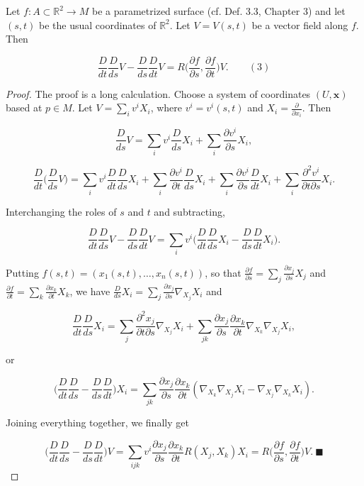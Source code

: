 \begin{lemma}
  \label{lem:dc-ch4-4-1}
  Let $f:A\subset\mathbb{R}^2\to M$ be a parametrized surface (cf. Def. 3.3, Chapter
  3) and let $(s,t)$ be the usual coordinates of $\mathbb{R}^2$. Let $V=V(s,t)$ be a
  vector field along $f$. Then
  
  $$
  \frac{D}{dt}\frac{D}{ds}V-\frac{D}{ds}\frac{D}{dt}V=R\Big(\frac{\partial f}{\partial s},\frac{\partial f}{\partial t}\Big)V.\qquad(3)
  $$
\end{lemma}
\begin{proof}
  The proof is a long calculation. Choose a system of coordinates
  $(U,\mathbf{x})$ based at $p\in M$. Let $V=\sum_i v^i X_i$, where $v^i=v^i(s,t)$ and
  $X_i=\frac{\partial}{\partial x_i}$. Then
  
  $$
  \frac{D}{ds}V=\sum_i v^i\frac{D}{ds}X_i+\sum_i\frac{\partial v^i}{\partial s}X_i,
  $$
  
  $$
  \frac{D}{dt}\Big(\frac{D}{ds}V\Big)=\sum_i v^i\frac{D}{dt}\frac{D}{ds}X_i+\sum_i\frac{\partial v^i}{\partial t}\frac{D}{ds}X_i+\sum_i\frac{\partial v^i}{\partial s}\frac{D}{dt}X_i+\sum_i\frac{\partial^2 v^i}{\partial t\partial s}X_i.
  $$
  
  Interchanging the roles of $s$ and $t$ and subtracting,
  
  $$
  \frac{D}{dt}\frac{D}{ds}V-\frac{D}{ds}\frac{D}{dt}V=\sum_i v^i\Big(\frac{D}{dt}\frac{D}{ds}X_i-\frac{D}{ds}\frac{D}{dt}X_i\Big).
  $$
  
  Putting $f(s,t)=(x_1(s,t),\dots,x_n(s,t))$, so that
  $\frac{\partial f}{\partial s}=\sum_j\frac{\partial x_j}{\partial s}X_j$ and
  $\frac{\partial f}{\partial t}=\sum_k\frac{\partial x_k}{\partial t}X_k$, we have
  $\frac{D}{ds}X_i=\sum_j\frac{\partial x_j}{\partial s}\nabla_{X_j}X_i$ and
  
  $$
  \frac{D}{dt}\frac{D}{ds}X_i=\sum_j\frac{\partial^2 x_j}{\partial t\partial s}\nabla_{X_j}X_i+\sum_{jk}\frac{\partial x_j}{\partial s}\frac{\partial x_k}{\partial t}\nabla_{X_k}\nabla_{X_j}X_i,
  $$
  
  or
  
  $$
  \Big(\frac{D}{dt}\frac{D}{ds}-\frac{D}{ds}\frac{D}{dt}\Big)X_i=\sum_{jk}\frac{\partial x_j}{\partial s}\frac{\partial x_k}{\partial t}(\nabla_{X_k}\nabla_{X_j}X_i-\nabla_{X_j}\nabla_{X_k}X_i).
  $$
  
  Joining everything together, we finally get
  
  $$
  \Big(\frac{D}{dt}\frac{D}{ds}-\frac{D}{ds}\frac{D}{dt}\Big)V=\sum_{ijk}v^i\frac{\partial x_j}{\partial s}\frac{\partial x_k}{\partial t}R(X_j,X_k)X_i=R\Big(\frac{\partial f}{\partial s},\frac{\partial f}{\partial t}\Big)V.\ \blacksquare
  $$
\end{proof}

